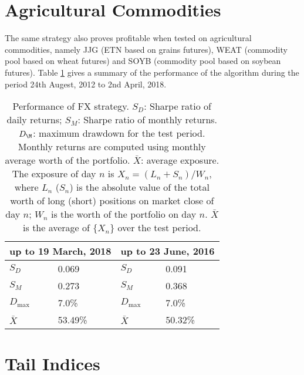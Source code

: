 \documentclass[12pt]{article}
\begin{document}
\section{Agricultural Commodities}
The same strategy also proves profitable when tested on agricultural
commodities, namely JJG (ETN based on grains futures), WEAT (commodity pool
based on wheat futures) and SOYB (commodity pool based on soybean
futures). Table \ref{tab:agricomm1} gives a summary of the performance
of the algorithm during the period 24th Augest, 2012 to 2nd April,
2018.
\begin{table}[htb!]
  \centering
  \begin{tabular}{ll||ll}
    \multicolumn{2}{c||}{up to 19 March, 2018}
    & \multicolumn{2}{c}{up to 23 June, 2016} \\
    \hline
    $S_D$ & 0.069 & $S_D$ & 0.091 \\
    $S_M$ & 0.273 & $S_M$ & 0.368 \\
    $D_{\text{max}}$ & 7.0\% & $D_{\text{max}}$ & 7.0\% \\
    $\bar X$ & 53.49\% & $\bar X$ & 50.32\% \\
  \end{tabular}
  \caption{Performance of FX strategy. $S_D$: Sharpe ratio of daily
    returns; $S_M$: Sharpe ratio of monthly returns. $D_\M$:
    maximum drawdown for the test period. Monthly returns are computed
    using monthly average worth of the portfolio. $\bar X$: average
    exposure. The exposure of day $n$ is $X_n = (L_n + S_n)/W_n$,
    where $L_n$ ($S_n$) is the absolute value of the total worth of
    long (short) positions on market close of day $n$; $W_n$ is the
    worth of the portfolio on day $n$. $\bar X$ is the average of
    $\{X_n\}$ over the test period.
  }
  \label{tab:agricomm1}
\end{table}



\section{Tail Indices}\label{sec:TailIndices}



\end{document}
